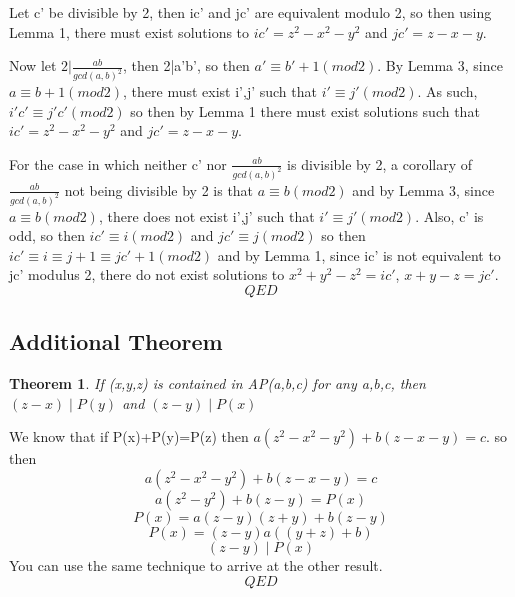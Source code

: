\documentclass{article}
\newtheorem{theorem}{Theorem}[section]
\begin{document}
Let c' be divisible by 2, then ic' and jc' are equivalent modulo 2, so then using Lemma 1, there must exist solutions to $ic' = z^2-x^2-y^2$ and $jc'=z-x-y$.

Now let $2|\frac{ab}{gcd(a,b)^2}$, then 2|a'b', so then $a'\equiv b' + 1(mod 2)$. By Lemma 3, since $a\equiv b+1(mod2)$, there must exist i',j' such that $i'\equiv j'(mod2)$. As such, $i'c'\equiv j'c'(mod2)$ so then by Lemma 1 there must exist solutions such that $ic' = z^2-x^2-y^2$ and $jc'=z-x-y$.

For the case in which neither c' nor $\frac{ab}{gcd(a,b)^2}$ is divisible by 2, a corollary of $\frac{ab}{gcd(a,b)^2}$ not being divisible by 2 is that $a\equiv b(mod 2)$ and by Lemma 3, since $a\equiv b(mod 2)$, there does not exist i',j' such that $i'\equiv j'(mod 2)$. Also, c' is odd, so then $ic'\equiv i(mod 2)$ and $jc'\equiv j(mod 2)$ so then $ic'\equiv i\equiv j + 1 \equiv jc' + 1(mod 2)$ and by Lemma 1, since ic' is not equivalent to jc' modulus 2, there do not exist solutions to $x^2+y^2-z^2 = ic'$, $x+y-z=jc'$.
$$QED$$


\subsection{Additional Theorem}
\begin{theorem}
If (x,y,z) is contained in AP(a,b,c) for any a,b,c, then $(z-x)\mid P(y)$ and $(z-y) \mid P(x)$
\end{theorem}
We know that if P(x)+P(y)=P(z) then $a(z^2-x^2-y^2)+b(z-x-y)=c$. so then
$$a(z^2-x^2-y^2)+b(z-x-y)=c$$
$$a(z^2-y^2)+b(z-y)= P(x)$$
$$P(x) =a(z-y)(z+y)+b(z-y)$$
$$P(x) =(z-y)a((y+z)+b)$$
$$(z-y)\mid P(x)$$
You can use the same technique to arrive at the other result.
$$QED$$
\end{document}
